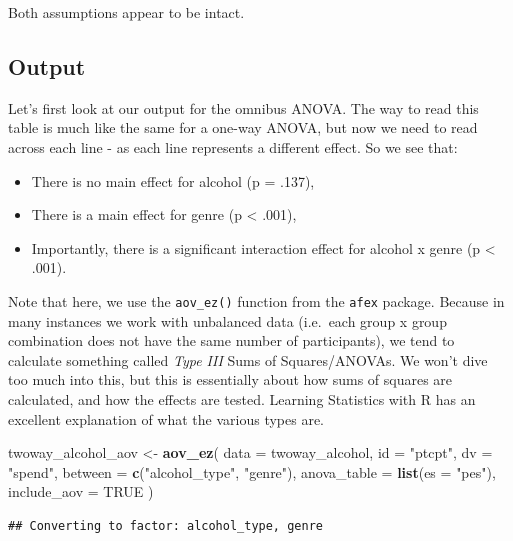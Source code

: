 \documentclass[
]{book}
\newenvironment{Shaded}{\begin{snugshade}}{\end{snugshade}}
\newcommand{\AttributeTok}[1]{\textcolor[rgb]{0.13,0.29,0.53}{#1}}
\newcommand{\ConstantTok}[1]{\textcolor[rgb]{0.56,0.35,0.01}{#1}}
\newcommand{\FunctionTok}[1]{\textcolor[rgb]{0.13,0.29,0.53}{\textbf{#1}}}
\newcommand{\NormalTok}[1]{#1}
\newcommand{\OtherTok}[1]{\textcolor[rgb]{0.56,0.35,0.01}{#1}}
\newcommand{\StringTok}[1]{\textcolor[rgb]{0.31,0.60,0.02}{#1}}
\providecommand{\tightlist}{%
  \setlength{\itemsep}{0pt}\setlength{\parskip}{0pt}}
\begin{document}
Both assumptions appear to be intact.

\subsection{Output}\label{output-7}

Let's first look at our output for the omnibus ANOVA. The way to read this table is much like the same for a one-way ANOVA, but now we need to read across each line - as each line represents a different effect. So we see that:

\begin{itemize}
\tightlist
\item
  There is no main effect for alcohol (p = .137),
\item
  There is a main effect for genre (p \textless{} .001),
\item
  Importantly, there is a significant interaction effect for alcohol x genre (p \textless{} .001).
\end{itemize}

Note that here, we use the \texttt{aov\_ez()} function from the \texttt{afex} package. Because in many instances we work with unbalanced data (i.e.~each group x group combination does not have the same number of participants), we tend to calculate something called \emph{Type III} Sums of Squares/ANOVAs. We won't dive too much into this, but this is essentially about how sums of squares are calculated, and how the effects are tested. Learning Statistics with R has an excellent explanation of what the various types are.

\begin{Shaded}
\begin{Highlighting}[]
\NormalTok{twoway\_alcohol\_aov }\OtherTok{\textless{}{-}} \FunctionTok{aov\_ez}\NormalTok{(}
  \AttributeTok{data =}\NormalTok{ twoway\_alcohol,}
  \AttributeTok{id =} \StringTok{"ptcpt"}\NormalTok{,}
  \AttributeTok{dv =} \StringTok{"spend"}\NormalTok{,}
  \AttributeTok{between =} \FunctionTok{c}\NormalTok{(}\StringTok{"alcohol\_type"}\NormalTok{, }\StringTok{"genre"}\NormalTok{),}
  \AttributeTok{anova\_table =} \FunctionTok{list}\NormalTok{(}\AttributeTok{es =} \StringTok{"pes"}\NormalTok{),}
  \AttributeTok{include\_aov =} \ConstantTok{TRUE}
\NormalTok{)}
\end{Highlighting}
\end{Shaded}

\begin{verbatim}
## Converting to factor: alcohol_type, genre
\end{verbatim}
\end{document}
